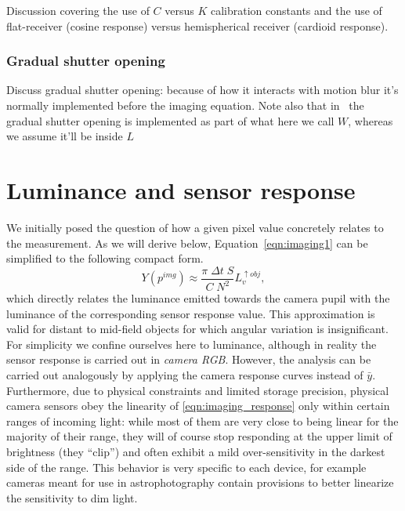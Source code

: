 \begin{inconstruction}
	Discussion covering the use of $C$ versus $K$ calibration constants and
	the use of flat-receiver (cosine response) versus hemispherical receiver 
	(cardioid response).
\end{inconstruction}

\subsubsection{Gradual shutter opening}

\begin{inconstruction}
	Discuss gradual shutter opening: because of how it interacts with motion blur
	it's normally implemented before the imaging equation.
	Note also that in~\cite{kolb95} the gradual shutter opening is implemented as part of what here
	we call $W$, whereas we assume it'll be inside $L$
\end{inconstruction}

\section{Luminance and sensor response}

We initially posed the question of how a given pixel value concretely
relates to the measurement. As we will derive below,
Equation~\eqref{eqn:imaging1} can be simplified to the following
compact form.
\begin{equation}\label{eqn:imaging_response}
	Y(p^{img}) \approx \frac{ \pi\;\Delta t\;S}{C\; N^2} L_v^{\uparrow obj},
\end{equation}
which directly relates the luminance emitted towards the camera pupil
with the luminance of the corresponding sensor response value. This approximation
is valid for distant to mid-field objects for which angular variation
is insignificant. For simplicity we confine ourselves here to luminance, although in
reality the sensor response is carried out in \textit{camera RGB}. However, the
analysis can be carried out analogously by applying the camera
response curves instead of $\bar y$. Furthermore, due to physical
constraints and limited storage precision, physical camera sensors
obey the linearity of \eqref{eqn:imaging_response} only within certain
ranges of incoming light: while most of them are very close to being linear for the
majority of their range, they will of course stop responding at the upper limit of 
brightness (they ``clip'') and often exhibit a mild over-sensitivity in the darkest 
side of the range. This behavior is very specific to each device, 
for example cameras meant for use in astrophotography contain provisions 
to better linearize the sensitivity to dim light.

